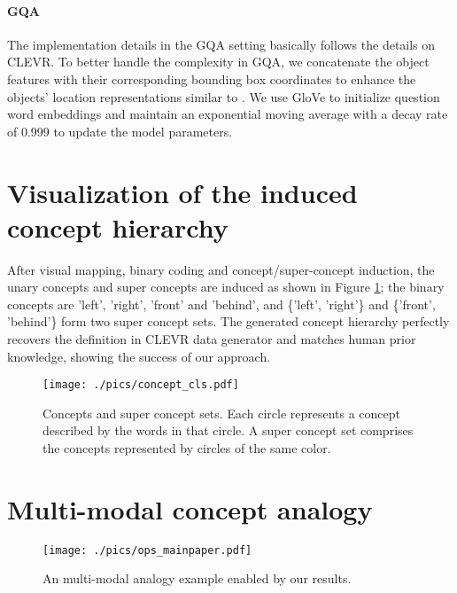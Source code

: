 \documentclass[10pt,twocolumn,letterpaper]{article}
\begin{document}
\paragraph{GQA}
The implementation details in the GQA setting basically follows the details on CLEVR.
To better handle the complexity in GQA,
we concatenate the object features with their corresponding bounding box coordinates to enhance the objects' location representations similar to \cite{hu2019language}. We use GloVe \cite{pennington2014glove} to initialize question word embeddings and maintain an exponential moving average with a decay rate of 0.999 to update the model parameters.


\section{Visualization of the induced concept hierarchy}
\label{app:concept_correlation}
After visual mapping, binary coding and concept/super-concept induction, the unary concepts and super concepts are induced as shown in Figure \ref{conc_cls}; the binary concepts are 'left', 'right', 'front' and 'behind', and \{'left', 'right'\} and \{'front', 'behind'\} form two super concept sets.
The generated concept hierarchy perfectly recovers the definition in CLEVR data generator and matches human prior knowledge, showing the success of our approach.



\begin{figure}
\centering
\texttt{[image: ./pics/concept\_cls.pdf]}
\caption{Concepts and super concept sets. Each circle represents a concept described by the words in that circle. A super concept set comprises the concepts represented by circles of the same color.}
\label{conc_cls}
\vspace{-3mm}
\end{figure}



\section{Multi-modal concept analogy}
\label{app:concept_analogy}
\begin{figure}[t]
\centering
\texttt{[image: ./pics/ops\_mainpaper.pdf]}
\caption{An multi-modal analogy example enabled by our results.}
\label{ops_main}
\vspace{-1mm}
\end{figure}
\end{document}
